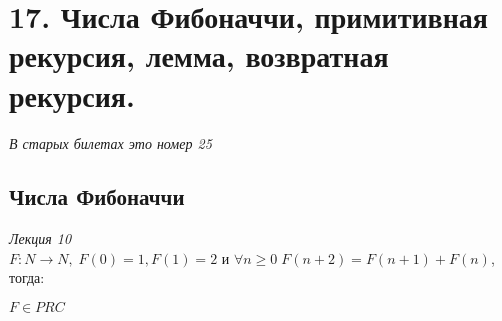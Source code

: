 \documentclass{article}
\begin{document}
        
\section{17. Числа Фибоначчи, примитивная рекурсия, лемма, возвратная рекурсия.}
\emph{В старых билетах это номер 25}\\

    \subsection{Числа Фибоначчи}
    \emph{Лекция 10}\\
    
        $F: N \rightarrow N,\; F(0) = 1, F(1) = 2 \text{ и } \forall n \geq 0\; F(n+2) = F(n+1) + F(n)$, тогда:
        
        $F \in PRC$\\
\end{document}
